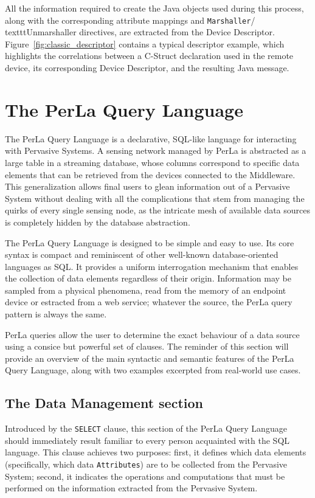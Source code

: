 All the information required to create the Java objects used during this
process, along with the corresponding attribute mappings and
\texttt{Marshaller}/\\texttt{Unmarshaller} directives, are extracted from the
Device Descriptor. Figure~\ref{fig:classic_descriptor} contains a typical
descriptor example, which highlights the correlations between a C-Struct
declaration used in the remote device, its corresponding Device Descriptor, and
the resulting Java message.

\section{The PerLa Query Language}
\label{sec:language}

The PerLa Query Language is a declarative, SQL-like language for interacting
with Pervasive Systems. A sensing network managed by PerLa is abstracted as a
large table in a streaming database, whose columns correspond to specific data
elements that can be retrieved from the devices connected to the Middleware.
This generalization allows final users to glean information out of a Pervasive
System without dealing with all the complications that stem from managing the
quirks of every single sensing node, as the intricate mesh of available data
sources is completely hidden by the database abstraction.

The PerLa Query Language is designed to be simple and easy to use. Its core
syntax is compact and reminiscent of other well-known database-oriented
languages as SQL. It provides a uniform interrogation mechanism that enables
the collection of data elements regardless of their origin. Information may be
sampled from a physical phenomena, read from the memory of an endpoint device
or estracted from a web service; whatever the source, the PerLa query pattern
is always the same.

PerLa queries allow the user to determine the exact behaviour of a data source
using a consice but powerful set of clauses. The reminder of this section will
provide an overview of the main syntactic and semantic features of the PerLa
Query Language, along with two examples excerpted from real-world use cases.

\subsection{The Data Management section}

Introduced by the \texttt{SELECT} clause, this section of the PerLa Query
Language should immediately result familiar to every person acquainted with the
SQL language. This clause achieves two purposes: first, it defines which data
elements (specifically, which data \texttt{Attributes}) are to be collected
from the Pervasive System; second, it indicates the operations and computations
that must be performed on the information extracted from the Pervasive System.

